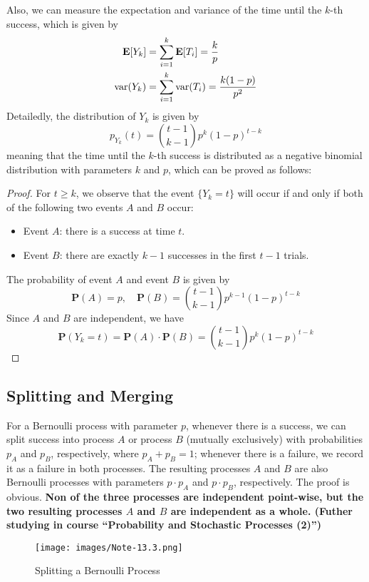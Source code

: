 \documentclass[device=normal, lang=en]{elegantbook}
\numberwithin{equation}{section}
\begin{document}
Also, we can measure the expectation and variance of the time until the $k$-th success, which is given by
\begin{align}
    \mathbf{E}\qty[Y_k] &= \sum_{i=1}^{k} \mathbf{E}\qty[T_i] = \frac{k}{p} \\
    \mathrm{var}\qty(Y_k) &= \sum_{i=1}^{k} \mathrm{var}\qty(T_i) = \frac{k(1-p)}{p^2}
\end{align}
Detailedly, the distribution of $Y_k$ is given by
\begin{equation}
    p_{Y_k}(t) = \binom{t-1}{k-1} p^k (1-p)^{t-k}
\end{equation}
meaning that the time until the $k$-th success is distributed as a negative binomial distribution with parameters $k$ and $p$, which can be proved as follows:
\begin{proof}
    For $t \geq k$, we observe that the event $\{Y_k = t\}$ will occur if and only if both of the following two events $A$ and $B$ occur:
    \begin{itemize}
        \item Event $A$: there is a success at time $t$.
        \item Event $B$: there are exactly $k-1$ successes in the first $t-1$ trials.
    \end{itemize}
    The probability of event $A$ and event $B$ is given by
    \begin{equation}
        \mathbf{P}(A) = p, \quad \mathbf{P}(B) = \binom{t-1}{k-1} p^{k-1} (1-p)^{t-k}
    \end{equation}
    Since $A$ and $B$ are independent, we have
    \begin{equation}
        \mathbf{P}(Y_k = t) = \mathbf{P}(A) \cdot \mathbf{P}(B) = \binom{t-1}{k-1} p^k (1-p)^{t-k}
    \end{equation}
\end{proof}

\subsection{Splitting and Merging}
For a Bernoulli process with parameter $p$, whenever there is a success, we can split success into process $A$ or process $B$ (mutually exclusively) with probabilities $p_A$ and $p_B$, respectively, where $p_A + p_B = 1$; whenever there is a failure, we record it as a failure in both processes. The resulting processes $A$ and $B$ are also Bernoulli processes with parameters $p\cdot p_A$ and $p \cdot p_B$, respectively. The proof is obvious. \textbf{Non of the three processes are independent point-wise, but the two resulting processes $A$ and $B$ are independent as a whole. (Futher studying in course ``Probability and Stochastic Processes (2)'')}
\begin{figure}[H]
    \centering
    \texttt{[image: images/Note-13.3.png]}
    \caption{Splitting a Bernoulli Process}
\end{figure}
\end{document}

